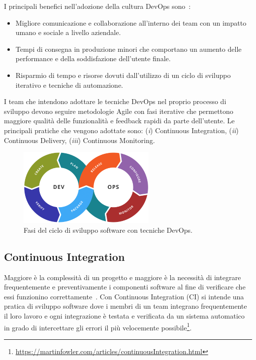 I principali benefici nell'adozione della cultura DevOps sono~\cite{krief2019learning}:
\begin{itemize}
    \item Migliore comunicazione e collaborazione all'interno dei team con un impatto umano e sociale a livello aziendale.
    \item Tempi di consegna in produzione minori che comportano un aumento delle performance e della soddisfazione dell'utente finale.
    \item Risparmio di tempo e risorse dovuti dall'utilizzo di un ciclo di sviluppo iterativo e tecniche di automazione.
\end{itemize}

I team che intendono adottare le tecniche DevOps nel proprio processo di sviluppo devono seguire metodologie Agile con fasi iterative che permettono maggiore qualità delle funzionalità e feedback rapidi da parte dell'utente. Le principali pratiche che vengono adottate sono: (\textit{i}) Continuous Integration, (\textit{ii}) Continuous Delivery, (\textit{iii}) Continuous Monitoring.

\begin{figure}[H]
    \centering
    \includegraphics[width=0.6\textwidth]{img/Devops-toolchain.png}
    \caption{Fasi del ciclo di sviluppo software con tecniche DevOps.}
\end{figure}

\subsection{Continuous Integration}
Maggiore è la complessità di un progetto e maggiore è la necessità di integrare frequentemente e preventivamente i componenti software al fine di verificare che essi funzionino correttamente~\cite{duvall2007continuous}. Con Continuous Integration (CI) si intende una pratica di sviluppo software dove i membri di un team integrano frequentemente il loro lavoro e ogni integrazione è testata e verificata da un sistema automatico in grado di intercettare gli errori il più velocemente possibile\footnote{\href{https://martinfowler.com/articles/continuousIntegration.html}{https://martinfowler.com/articles/continuousIntegration.html}}.

